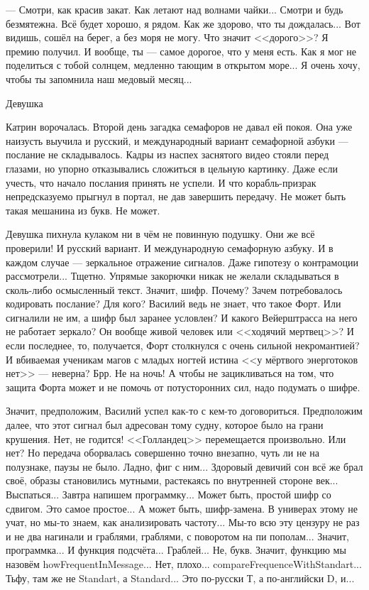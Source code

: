 --- Смотри, как красив закат. Как летают над волнами чайки... Смотри и будь безмятежна. Всё будет хорошо, я рядом.
Как же здорово, что ты дождалась... Вот видишь, сошёл на берег, а без моря не могу.
Что значит <<дорого>>? Я премию получил. И вообще, ты --- самое дорогое, что у меня есть.
Как я мог не поделиться с тобой солнцем, медленно тающим в открытом море... Я очень хочу, чтобы ты запомнила наш медовый месяц...

Девушка







Катрин ворочалась. Второй день загадка семафоров не давал ей покоя.
Она уже наизусть выучила и русский, и международный вариант семафорной азбуки --- послание не складывалось.
Кадры из наспех заснятого видео стояли перед глазами, но упорно отказывались сложиться в цельную картинку.
Даже если учесть, что начало послания принять не успели.
И что корабль-призрак непредсказуемо прыгнул в портал, не дав завершить передачу. Не может быть такая мешанина из букв. Не может.

Девушка пихнула кулаком ни в чём не повинную подушку. Они же всё проверили! И русский вариант.
И международную семафорную азбуку. И в каждом случае --- зеркальное отражение сигналов. Даже гипотезу о контрамоции рассмотрели...
Тщетно. Упрямые закорючки никак не желали складываться в сколь-либо осмысленный текст. Значит, шифр.
Почему? Зачем потребовалось кодировать послание? Для кого? Василий ведь не знает, что такое Форт.
Или сигналили не им, а шифр был заранее условлен? И какого Вейерштрасса на него не работает зеркало?
Он вообще живой человек или <<ходячий мертвец>>?
И если последнее, то, получается, Форт столкнулся с очень сильной некромантией?
И вбиваемая ученикам магов с младых ногтей истина <<у мёртвого энерготоков нет>> --- неверна? Брр. Не на ночь!
А чтобы не зацикливаться на том, что защита Форта может и не помочь от потусторонних сил, надо подумать о шифре.

Значит, предположим, Василий успел как-то с кем-то договориться.
Предположим далее, что этот сигнал был адресован тому судну, которое было на грани крушения. Нет, не годится!
<<Голландец>> перемещается произвольно. Или нет?
Но передача оборвалась совершенно точно внезапно, чуть ли не на полузнаке, паузы не было. Ладно, фиг с ним...
Здоровый девичий сон всё же брал своё, образы становились мутными, растекаясь по внутренней стороне век... Выспаться...
Завтра напишем программку... Может быть, простой шифр со сдвигом. Это самое простое... А может быть, шифр-замена.
В универах этому не учат, но мы-то знаем, как анализировать частоту...
Мы-то всю эту цензуру не раз и не два нагинали и граблями, граблями, с поворотом на пи пополам...
Значит, программка... И функция подсчёта... Граблей... Не, букв. Значит, функцию мы назовём howFrequentInMessage...
Нет, плохо... compareFrequenceWithStandart... Тьфу, там же не Standart, а Standard... Это по-русски Т, а по-английски D, и...

